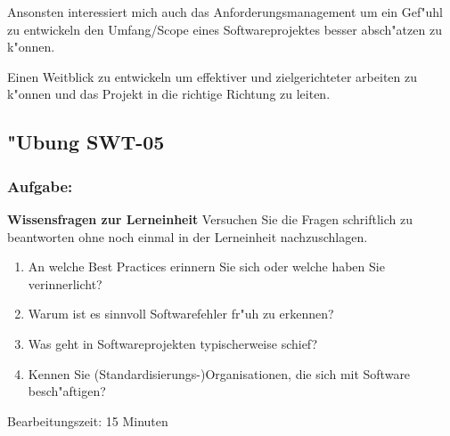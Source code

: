 Ansonsten interessiert mich auch das Anforderungsmanagement um ein Gef"uhl zu entwickeln den Umfang/Scope eines Softwareprojektes besser absch"atzen zu k"onnen.

Einen Weitblick zu entwickeln um effektiver und zielgerichteter arbeiten zu k"onnen und das Projekt in die richtige Richtung zu leiten.

\newpage
\subsection{"Ubung SWT-05}
\subsubsection*{Aufgabe:}

\begin{framed}
\textbf{Wissensfragen zur Lerneinheit}
\smallbreak
Versuchen Sie die Fragen schriftlich zu beantworten ohne noch einmal in der Lerneinheit nachzuschlagen.
\begin{enumerate}
\item An welche Best Practices erinnern Sie sich oder welche haben Sie verinnerlicht?
\item Warum ist es sinnvoll Softwarefehler fr"uh zu erkennen?
\item Was geht in Softwareprojekten typischerweise schief?
\item Kennen Sie (Standardisierungs-)Organisationen, die sich mit Software besch"aftigen?
\end{enumerate}
\bigbreak
\small Bearbeitungszeit: 15 Minuten
\end{framed}
\bigbreak
\bigbreak
